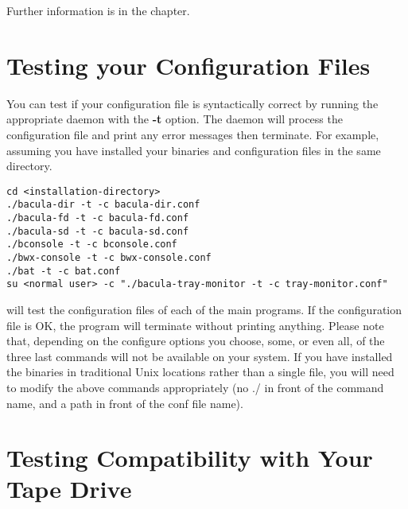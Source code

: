 Further information is in the
 chapter.

\section{Testing your Configuration Files}

You can test if your configuration file is syntactically correct by running
the appropriate daemon with the {\bf -t} option. The daemon will process the
configuration file and print any error messages then terminate. For example,
assuming you have installed your binaries and configuration files in the same
directory. 

\footnotesize
\begin{verbatim}
cd <installation-directory>
./bacula-dir -t -c bacula-dir.conf
./bacula-fd -t -c bacula-fd.conf
./bacula-sd -t -c bacula-sd.conf
./bconsole -t -c bconsole.conf
./bwx-console -t -c bwx-console.conf
./bat -t -c bat.conf
su <normal user> -c "./bacula-tray-monitor -t -c tray-monitor.conf"
\end{verbatim}
\normalsize

will test the configuration files of each of the main programs. If the
configuration file is OK, the program will terminate without printing
anything. Please note that, depending on the configure options you choose,
some, or even all, of the three last commands will not be available on your
system. If you have installed the binaries in traditional Unix locations
rather than a single file, you will need to modify the above commands
appropriately (no ./ in front of the command name, and a path in front of the
conf file name). 
\label{TapeTesting}

\section{Testing Compatibility with Your Tape Drive}


